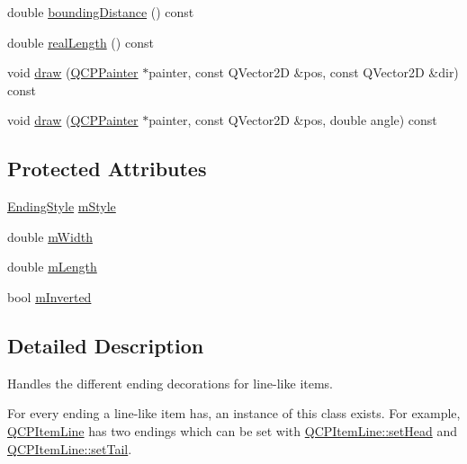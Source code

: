 \begin{DoxyCompactItemize}
double \hyperlink{class_q_c_p_line_ending_a586b45cf738881a70119e353dc1ed59c}{bounding\-Distance} () const 
\item 
double \hyperlink{class_q_c_p_line_ending_a6a528e6dc5aabe1077a573b045715f03}{real\-Length} () const 
\item 
void \hyperlink{class_q_c_p_line_ending_ac4b2fa94bd27b2f008b5fc090fcd7c0b}{draw} (\hyperlink{class_q_c_p_painter}{Q\-C\-P\-Painter} $\ast$painter, const Q\-Vector2\-D \&pos, const Q\-Vector2\-D \&dir) const 
\item 
void \hyperlink{class_q_c_p_line_ending_a05c143b1f66cb68d746c309523c45e3e}{draw} (\hyperlink{class_q_c_p_painter}{Q\-C\-P\-Painter} $\ast$painter, const Q\-Vector2\-D \&pos, double angle) const 
\end{DoxyCompactItemize}
\subsection*{Protected Attributes}
\begin{DoxyCompactItemize}
\item 
\hyperlink{class_q_c_p_line_ending_a5ef16e6876b4b74959c7261d8d4c2cd5}{Ending\-Style} \hyperlink{class_q_c_p_line_ending_a4696fc9117b60f1ca7690fcd2ba56611}{m\-Style}
\item 
double \hyperlink{class_q_c_p_line_ending_aca89d21341133c20dc6825c33a5eac48}{m\-Width}
\item 
double \hyperlink{class_q_c_p_line_ending_ae8e1e2566b96c05736cd92662dba8af8}{m\-Length}
\item 
bool \hyperlink{class_q_c_p_line_ending_a91306fe771d54c955e0af21af14349d5}{m\-Inverted}
\end{DoxyCompactItemize}


\subsection{Detailed Description}
Handles the different ending decorations for line-\/like items. 

 For every ending a line-\/like item has, an instance of this class exists. For example, \hyperlink{class_q_c_p_item_line}{Q\-C\-P\-Item\-Line} has two endings which can be set with \hyperlink{class_q_c_p_item_line_aebf3d687114d584e0459db6759e2c3c3}{Q\-C\-P\-Item\-Line\-::set\-Head} and \hyperlink{class_q_c_p_item_line_ac264222c3297a7efe33df9345c811a5f}{Q\-C\-P\-Item\-Line\-::set\-Tail}.

